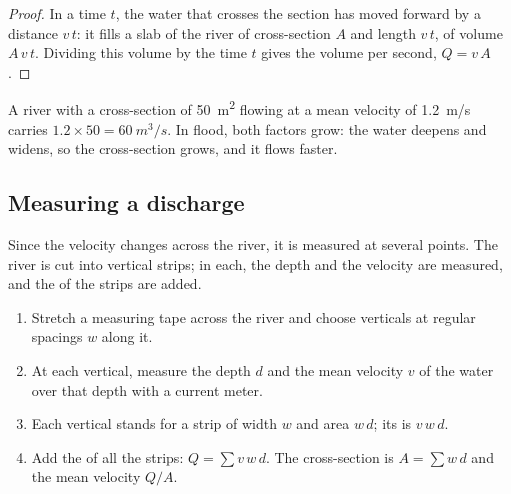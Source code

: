 \begin{proof}
In a time $t$, the water that crosses the section has moved forward by a
distance $v\,t$: it fills a slab of the river of cross-section $A$ and
length $v\,t$, of volume $A\,v\,t$. Dividing this volume by the time $t$
gives the volume per second, $Q = v\,A$.
\end{proof}

A river with a cross-section of \qty{50}{m^2} flowing at a mean velocity of
\qty{1.2}{m/s} carries $1.2 \times 50 = \qty{60}{m^3/s}$. In flood, both
factors grow: the water deepens and widens, so the cross-section grows, and
it flows faster.

\subsection*{Measuring a discharge}

Since the velocity changes across the river, it is measured at several
points. The river is cut into vertical strips; in each, the depth and the
velocity are measured, and the  of the strips are added.

\begin{method}\label{met:g10:drainage-basins:velocity-area}
\begin{enumerate}
  \item Stretch a measuring tape across the river and choose verticals at
        regular spacings $w$ along it.
  \item At each vertical, measure the depth $d$ and the mean velocity $v$
        of the water over that depth with a current meter.
  \item Each vertical stands for a strip of width $w$ and area $w\,d$; its
         is $v\,w\,d$.
  \item Add the  of all the strips: $Q = \sum v\,w\,d$.
        The cross-section is $A = \sum w\,d$ and the mean velocity $Q/A$.
\end{enumerate}
\end{method}

